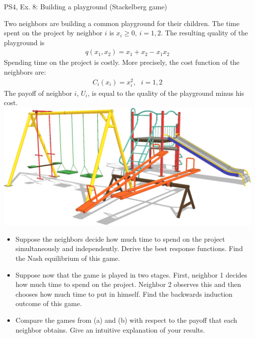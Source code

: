 \begin{frame}{PS4, Ex. 8: Building a playground (Stackelberg game)}
  \begin{multicols}{2}
    Two neighbors are building a common playground for their children. The time spent on the project by neighbor $i$ is $x_i \geq 0,\ i = 1, 2$. The resulting quality of the playground is
    \begin{align*}
      q(x_1,x_2)=x_1+x_2-x_1x_2
    \end{align*}
    Spending time on the project is costly. More precisely, the cost function of the neighbors are:
    \begin{align*}
      C_i(x_i)=x_i^2,\ \ \ i=1,2
    \end{align*}
    The payoff of neighbor $i$, $U_i$, is equal to the quality of the playground minus his cost.
    \includegraphics[width=\columnwidth]{figures/playground}
  \vfill\null \columnbreak
    \begin{itemize}
      \item[(a)] Suppose the neighbors decide how much time to spend on the project simultaneously and independently. Derive the best response functions. Find the Nash equilibrium of this game.
      \item[(b)] Suppose now that the game is played in two stages. First, neighbor 1 decides how much time to spend on the project. Neighbor 2 observes this and then chooses how much time to put in himself. Find the backwards induction outcome of this game.
      \item[(c)] Compare the games from (a) and (b) with respect to the payoff that each neighbor obtains. Give an intuitive explanation of your results.
    \end{itemize}
  \vfill\null
  \end{multicols}
\end{frame}

